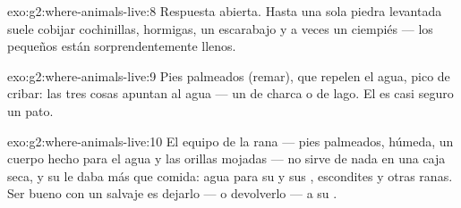 \begin{solution}{exo:g2:where-animals-live:8}
Respuesta abierta. Hasta una sola piedra levantada suele cobijar
cochinillas, hormigas, un escarabajo y a veces un ciempiés --- los
 pequeños están sorprendentemente llenos.
\end{solution}

\begin{solution}{exo:g2:where-animals-live:9}
Pies palmeados (remar),  que repelen el agua, pico de cribar:
las tres cosas apuntan al agua --- un  de charca o de lago. El
 es casi seguro un pato.
\end{solution}

\begin{solution}{exo:g2:where-animals-live:10}
El equipo de la rana --- pies palmeados,  húmeda, un cuerpo hecho
para el agua y las orillas mojadas --- no sirve de nada en una caja
seca, y su  le daba más que comida: agua para su  y sus
, escondites y otras ranas. Ser bueno con un  salvaje es
dejarlo --- o devolverlo --- a su .
\end{solution}

